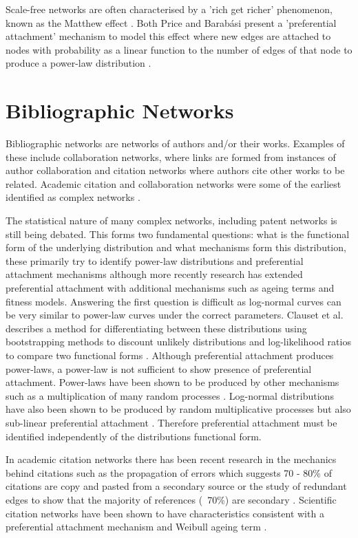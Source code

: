 Scale-free networks are often characterised by a 'rich get richer' phenomenon, known as the Matthew effect \cite{merton1968matthew}. Both Price and Barabási present a 'preferential attachment' mechanism to model this effect where new edges are attached to nodes with probability as a linear function to the number of edges of that node to produce a power-law distribution \cite{albert2002statistical,price1976general}. 

\section{Bibliographic Networks}

Bibliographic networks are networks of authors and/or their works. Examples of these include collaboration networks, where links are formed from instances of author collaboration and citation networks where authors cite other works to be related. Academic citation and collaboration networks were some of the earliest identified as complex networks \cite{albert2002statistical}. 

The statistical nature of many complex networks, including patent networks is still being debated. This forms two fundamental questions: what is the functional form of the underlying distribution and what mechanisms form this distribution, these primarily try to identify power-law distributions and preferential attachment mechanisms although more recently research has extended preferential attachment with additional mechanisms such as ageing terms and fitness models. Answering the first question is difficult as log-normal curves can be very similar to power-law curves under the correct parameters. Clauset et al. describes a method for differentiating between these distributions using bootstrapping methods to discount unlikely distributions and log-likelihood ratios to compare two functional forms \cite{clauset2009power}. Although preferential attachment produces power-laws, a power-law is not sufficient to show presence of preferential attachment. Power-laws have been shown to be produced by other mechanisms such as a multiplication of many random processes \cite{newman2005power}. Log-normal distributions have also been shown to be produced by random multiplicative processes but also sub-linear preferential attachment \cite{redner2000random}. Therefore preferential attachment must be identified independently of the distributions functional form.  

In academic citation networks there has been recent research in the mechanics behind citations such as the propagation of errors which suggests 70 - 80\% of citations are copy and pasted from a secondary source \cite{simkin2005stochastic} or the study of redundant edges to show that the majority of references (~70\%) are secondary \cite{clough2015transitive}. Scientific citation networks have been shown to have characteristics consistent with a preferential attachment mechanism and Weibull ageing term \cite{borner2004simultaneous}.

